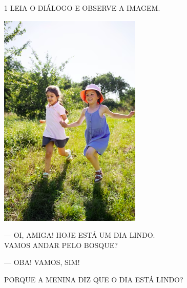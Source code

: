 
\num{1} LEIA O DIÁLOGO E OBSERVE A IMAGEM.

\begin{minipage}{.3\textwidth}
\includegraphics[width=\textwidth]{media/image175a.png}
\end{minipage}\hspace{.5cm}
\begin{minipage}{.7\textwidth}
— OI, AMIGA! HOJE ESTÁ UM DIA LINDO.\\
VAMOS ANDAR PELO BOSQUE?

— OBA! VAMOS, SIM!
\end{minipage}\bigskip

PORQUE A MENINA DIZ QUE O DIA ESTÁ LINDO? 

